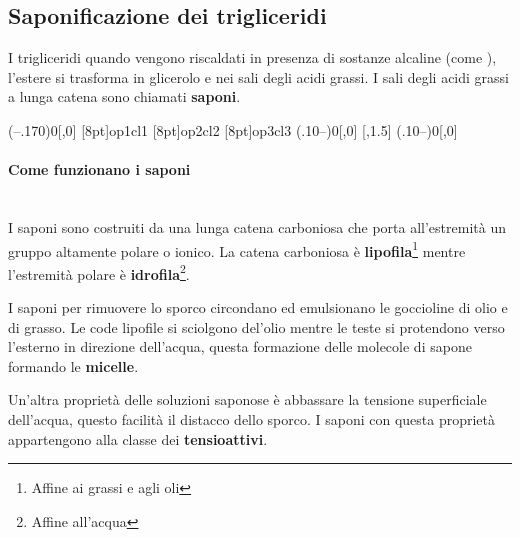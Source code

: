 \subsection{Saponificazione dei trigliceridi}
I trigliceridi quando vengono riscaldati in presenza di sostanze alcaline (come ), l'estere si trasforma in glicerolo e nei sali degli acidi grassi. I sali degli acidi grassi a lunga catena sono chiamati \textbf{saponi}.
\chemnameinit{}
{\small
\begin{reaction}
	\arrow(--.170){0}[,0]
	\makepolymerdelims[delimiters=(),subscript=$\scriptstyle \!8$]{2pt}[8pt]{op1}{cl1}
	\makepolymerdelims[delimiters=(),subscript=$\scriptstyle \!8$]{2pt}[8pt]{op2}{cl2}
	\makepolymerdelims[delimiters=(),subscript=$\scriptstyle \!8$]{2pt}[8pt]{op3}{cl3}
	\arrow(.10--){0}[,0]\+ 
	[,1.5]
	 \arrow(.10--){0}[,0] 
\end{reaction}}

\paragraph{Come funzionano i saponi}\mbox{}\\
I saponi sono costruiti da una lunga catena carboniosa che porta all'estremità un gruppo altamente polare o ionico. La catena carboniosa è \textbf{lipofila}\footnote{Affine ai grassi e agli oli} mentre l'estremità polare è \textbf{idrofila}\footnote{Affine all'acqua}.

I saponi per rimuovere lo sporco circondano ed emulsionano le goccioline di olio e di grasso. Le code lipofile si sciolgono del'olio mentre le teste si protendono verso l'esterno in direzione dell'acqua, questa formazione delle molecole di sapone formando le \textbf{micelle}.


Un'altra proprietà delle soluzioni saponose è abbassare la tensione superficiale dell'acqua, questo facilità il distacco dello sporco. I saponi con questa proprietà appartengono alla classe dei \textbf{tensioattivi}.

